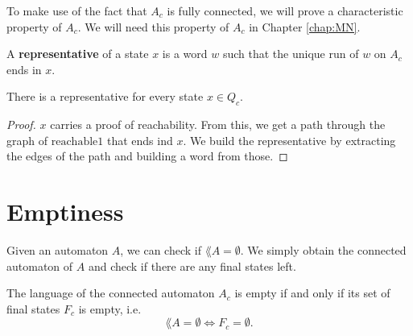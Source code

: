 To make use of the fact that $A_c$ is fully connected, we will prove a characteristic property of $A_c$. 
We will need this property of $A_c$ in Chapter \ref{chap:MN}.


\begin{definition}
    A \textbf{representative} of a state $x$ is a word $w$ such that the unique run of $w$ on $A_c$ ends in $x$.
\end{definition}

\begin{lemma}
    \label{dfa_connected_repr}
    There is a representative for every state $x \in Q_c$.
\end{lemma}

\begin{proof}
    $x$ carries a proof of reachability.
    From this, we get a path through the graph of $\mathrm{reachable1}$ that ends ind $x$.
    We build the representative by extracting the edges of the path and building a word from those.
\end{proof}





\section{Emptiness}

Given an automaton $A$, we can check if $\lang{A} = \emptyset$. We simply obtain the connected automaton of $A$ and check if there are any final states left. 

\begin{theorem}
    \label{dfa_lang_empty}
    The language of the connected automaton $A_c$ is empty if and only if its set of final states $F_c$ is empty, i.e.
    \begin{equation*}
        \lang{A} = \emptyset \iff F_c = \emptyset.
    \end{equation*}
\end{theorem}

